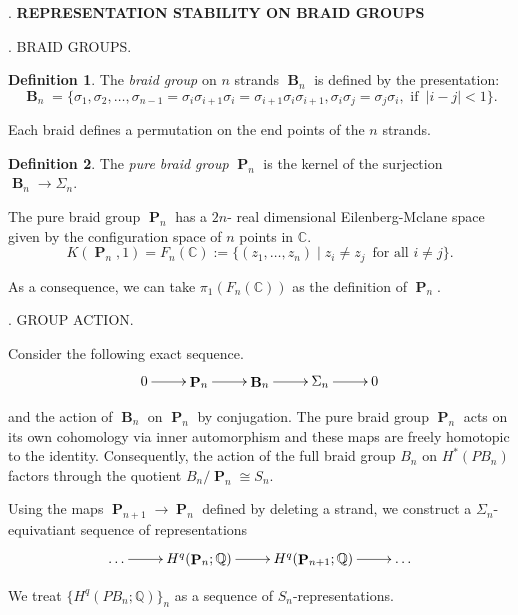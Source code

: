 \documentclass[11pt, letterpaper, notitlepage, oneside]{amsart}
\DeclareMathOperator{\B}{\mathbf{B}}
\DeclareMathOperator{\PB}{\mathbf{P}}
\newcommand{\bbQ}{\mathbb{Q}}
\newcommand{\bbC}{\mathbb{C}}
\theoremstyle{definition}
\newtheorem{definition}{Definition}
\theoremstyle{plain}
\begin{document}
 \setlength{\footskip}{1.0pt}.
\centering
\large{\textbf{REPRESENTATION STABILITY ON BRAID GROUPS}}
\vspace{10pt}


\justifying

. BRAID GROUPS.
\begin{definition}
   The \emph{braid group} on $n$ strands $\B_n$ is defined by the presentation:
   \[\B_n=\{\sigma_1, \sigma_2, \dots, \sigma_{n-1}= \sigma_i\sigma_{i+1}\sigma_i=\sigma_{i+1}\sigma_i\sigma_{i+1}, \sigma_{i}\sigma_j=\sigma_j\sigma_i, \,\,\text{if}\,\,\, |i-j|<1\}.\]
\end{definition}
\noindent Each braid defines a permutation on the end points of the $n$ strands.

\begin{definition}
     The \emph{pure braid group} $\PB_n$ is the kernel of the surjection $\B_n\to \Sigma_n$.
 
\end{definition}  

\noindent The pure braid group $\PB_n$ has a $2n$- real dimensional Eilenberg-Mclane space given by the configuration space of $n$ points in $\bbC$. \[K(\PB_n,1) = F_n(\bbC):= \{(z_1, \dots, z_n)\mid z_i\neq z_j  \,\,\, \text{for all} \,\, i\neq j\}.\]


  \noindent As a consequence, we can take $\pi_1(F_n(\bbC))$ as the definition of $\PB_n$.

\vspace{10pt}

. GROUP ACTION.
\vspace{10pt}

\noindent Consider the following exact sequence. \[\xymatrix{0 \ar[r] & \PB_n \ar[r]& \B_n \ar[r] &\Sigma_n \ar[r] & 0}\]

\noindent and the action of $\B_n$ on $\PB_n$ by conjugation. The pure braid group $\PB_n$ acts on its own cohomology via inner automorphism and these maps are freely homotopic to the identity. Consequently, the action of the full braid group $B_n$ on $H^*(PB_n)$ factors through the quotient $B_n / \PB_n \cong S_n$. 

\noindent Using the maps $\PB_{n+1}\to \PB_n$ defined by deleting a strand, we construct a $\Sigma_n$-equivatiant sequence of representations \[\xymatrix{\ldots \ar[r] & H^q(\PB_n; \bbQ) \ar[r] &H^q(\PB_{n+1}; \bbQ) \ar[r] & \ldots }\]

\noindent We treat $\{H^q(PB_n; \mathbb{Q})\}_n$ as a sequence of $S_n$-representations.
\end{document}
